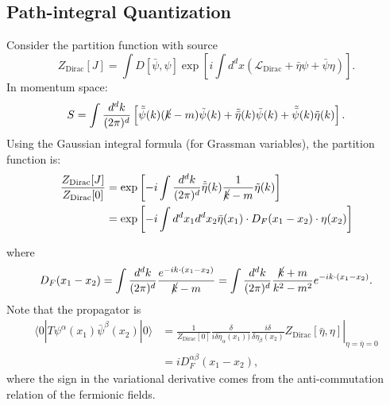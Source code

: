\subsection{Path-integral Quantization}

Consider the partition function with source
\begin{equation}
	Z_{\mathrm{Dirac}}[J]
	= \int D[\bar\psi,\psi] \exp\left[i\int d^dx \left(\mathcal{L}_{\mathrm{Dirac}}+\bar{\eta}\psi + \bar\psi\eta \right) \right].
\end{equation}
In momentum space:
\begin{equation}
	S = \int\frac{d^d k}{(2\pi)^d} \left[
		\tilde{\bar\psi}(k)(\cancel{k}-m)\tilde{\psi}(k) +
		\tilde{\bar\eta}(k) \tilde{\psi}(k) +
		\tilde{\bar\psi}(k) \tilde{\eta}(k)
	\right].
\end{equation}
Using the Gaussian integral formula (for Grassman variables), the partition function is:
\begin{equation}
\begin{aligned}
	\frac{Z_{\mathrm{Dirac}}[J]}{Z_{\mathrm{Dirac}}[0]}
	&= \exp\left[-i\int \frac{d^d k}{(2\pi)^d} \tilde{\bar\eta}(k)\frac{1}{\cancel{k}-m}\tilde\eta(k)\right] \\
	&= \exp\left[-i\int d^dx_1 d^d x_2 \bar{\eta}(x_1)\cdot D_F(x_1-x_2)\cdot \eta(x_2) \right]
\end{aligned}
\end{equation}

where
\begin{equation}
	D_F(x_1-x_2) = \int \frac{d^d k}{(2\pi)^d} \frac{e^{-i k \cdot (x_1-x_2)}}{\cancel{k}-m}
	= \int \frac{d^d k}{(2\pi)^d} \frac{\cancel{k}+m}{k^2-m^2} e^{-i k \cdot (x_1-x_2)}.
\end{equation}
Note that the propagator is
\begin{equation}
\begin{aligned}
	\langle 0| T \psi^\alpha(x_1) \bar\psi^\beta(x_2) |0\rangle
	&= \left.\frac{1}{Z_{\mathrm{Dirac}}[0]}\frac{\delta}{i\delta \bar{\eta}_\alpha(x_1))}\frac{i\delta}{\delta\eta_\beta(x_2)} Z_{\mathrm{Dirac}}[\bar\eta,\eta]\right|_{\eta=\bar\eta=0} \\
	&= i D^{\alpha\beta}_F(x_1-x_2),
\end{aligned}
\end{equation}
where the sign in the variational derivative comes from the anti-commutation relation of the fermionic fields.




